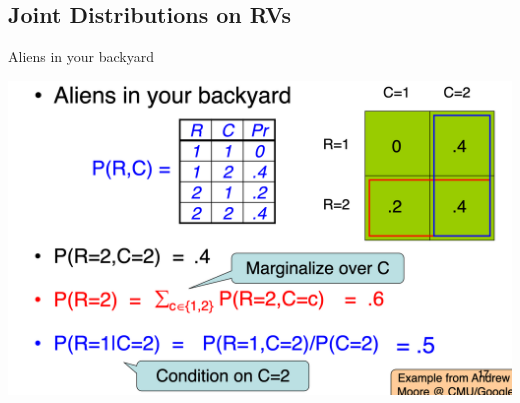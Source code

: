 \documentclass[11pt]{article}
\theoremstyle{definition}
\begin{document}
\subsection{Joint Distributions on RVs}
Aliens in your backyard

\includegraphics[width=\textwidth]{6.png}
\end{document}
